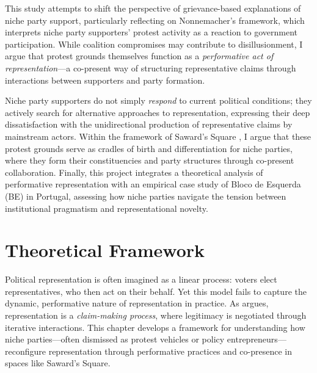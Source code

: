This study attempts to shift the perspective of grievance-based explanations of niche party support, particularly reflecting on Nonnemacher’s \parencite*{nonnemacher2023} framework, which interprets niche party supporters’ protest activity as a reaction to government participation. While coalition compromises may contribute to disillusionment, I argue that protest grounds themselves function as a \textit{performative act of representation}—a co-present way of structuring representative claims through interactions between supporters and party formation.

Niche party supporters do not simply \textit{respond} to current political conditions; they actively search for alternative approaches to representation, expressing their deep dissatisfaction with the unidirectional production of representative claims by mainstream actors. Within the framework of Saward’s Square \parencite[]{saward2024}, I argue that these protest grounds serve as cradles of birth and differentiation for niche parties, where they form their constituencies and party structures through co-present collaboration. Finally, this project integrates a theoretical analysis of performative representation with an empirical case study of Bloco de Esquerda (BE) in Portugal, assessing how niche parties navigate the tension between institutional pragmatism and representational novelty.

\chapter{Theoretical Framework}\label{chap:Theoretical Framework} %

Political representation is often imagined as a linear process: voters elect representatives, who then act on their behalf. Yet this model fails to capture the dynamic, performative nature of representation in practice. As \textcite{saward2010} argues, representation is a \textit{claim-making process}, where legitimacy is negotiated through iterative interactions. This chapter develops a framework for understanding how niche parties—often dismissed as protest vehicles or policy entrepreneurs—reconfigure representation through performative practices and co-presence in spaces like Saward’s Square.

